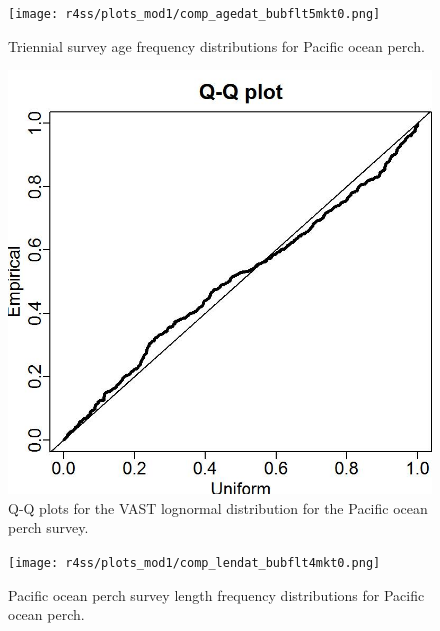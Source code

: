 \documentclass[12pt,]{article}
\begin{document}
\FloatBarrier

\begin{figure}
\centering
\texttt{[image: r4ss/plots\_mod1/comp\_agedat\_bubflt5mkt0.png]}
\caption{Triennial survey age frequency distributions for Pacific ocean
perch. \label{fig:Tri_Age}}
\end{figure}

\FloatBarrier

\begin{figure}
\centering
\includegraphics{Figures/Q-Q_plot_pop.jpg}
\caption{Q-Q plots for the VAST lognormal distribution for the Pacific
ocean perch survey. \label{fig:pop_qq}}
\end{figure}

\FloatBarrier

\begin{figure}
\centering
\texttt{[image: r4ss/plots\_mod1/comp\_lendat\_bubflt4mkt0.png]}
\caption{Pacific ocean perch survey length frequency distributions for
Pacific ocean perch. \label{fig:POP_Length}}
\end{figure}

\FloatBarrier
\end{document}
